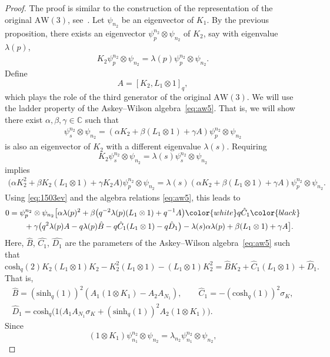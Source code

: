 \documentclass[pdftex]{sigma}
\numberwithin{equation}{section}
\newcommand{\CC}{\mathbb{C}}
\newcommand{\aw}{\mathrm{AW}\!\left(3\right)}
\newcommand{\chq}{\mathrm{cosh}_q}
\newcommand{\psimn}[2]{\psi_{#1}^{#2}\otimes \psi_{#2}}
\newcommand{\shq}{\mathrm{sinh}_q}
\begin{document}
\begin{proof}
	The proof is similar to the construction of the representation of the original $\aw$, see~\cite{Zhedanov1991}. Let $\psi_{n_2}$ be an eigenvector of $K_1$. By the previous proposition, there exists an eigenvector $\psi_{p}^{n_2}\otimes \psi_{n_2}$ of $K_2$, say with eigenvalue $\lambda(p)$,
	\begin{gather}
		K_2 \psimn{p}{n_2} = \lambda(p) \psimn{p}{n_2}.\label{eq:1503ev}
	\end{gather}
	Define
	\[
	A=[K_2,L_1\otimes 1]_q,
	\]
	which plays the role of the third generator of the original $\aw$. We will use the ladder property of the Askey--Wilson algebra~\eqref{eq:aw5}. That is, we will show there exist $\alpha,\beta,\gamma\in\CC$ such that
	\begin{gather*}
		\psimn{s}{n_2} = \left(\alpha K_2 + \beta (L_1\otimes 1) + \gamma A\right)\psimn{p}{n_2}
	\end{gather*}
	is also an eigenvector of $K_2$ with a different eigenvalue $\lambda(s)$. Requiring
	\[K_2\psimn{s}{n_2} = \lambda(s) \psimn{s}{n_2}\]
	implies
	\begin{gather*}
		\big( \alpha K_2^2 + \beta K_2(L_1\otimes 1) + \gamma K_2A\big)\psimn{p}{n_2} = \lambda(s) (\alpha K_2 + \beta (L_1\otimes 1) + \gamma A )\psimn{p}{n_2}.
	\end{gather*}
	Using \eqref{eq:1503ev} and the algebra relations \eqref{eq:aw5}, this leads to
	\begin{gather*}
		0= \psimn{p}{n_2}\big[ \alpha \lambda(p)^2 + \beta \big(q^{-2}\lambda(p)(L_1\otimes 1) + q^{-1}A \big) \color{white}q\hat{C}_1\color{black} \\
\hphantom{0=}{} +\gamma \big(q^2\lambda(p)A - q\lambda(p)\hat{B} - q\hat{C}_1(L_1\otimes 1) - q\hat{D}_1\big) - \lambda(s) \alpha \lambda(p) + \beta (L_1\otimes 1) + \gamma A\big].
	\end{gather*}
	Here, $\hat{B}$, $\hat{C_1}$, $\hat{D_1}$ are the parameters of the Askey--Wilson algebra~\eqref{eq:aw5} such that
	\[
	\chq(2) K_2 (L_1\otimes 1) K_2 - K_2^2 (L_1\otimes 1) - (L_1\otimes 1) K_2^2 = \hat{B}K_2 + \hat{C}_1 (L_1\otimes 1) + \hat{D}_1.
	\]
	That is,
	\begin{gather*}
		\hat{B}=(\shq(1))^2 ( A_1 (1\otimes K_1)- A_2 A_{N_1} ),\qquad \hat{C}_1 = -(\chq(1))^2 \sigma_K,\\
		\hat{D}_1= \chq(1\big(A_1A_{N_1}\sigma_K + (\shq(1))^2A_2 (1\otimes K_1)\big).
	\end{gather*}
	Since
	\[
	(1\otimes K_1) \psi_{n_1}^{n_2}\otimes\psi_{n_2} = \lambda_{n_2} \psi_{n_1}^{n_2}\otimes\psi_{n_2},
\]
\end{proof}
\end{document}
